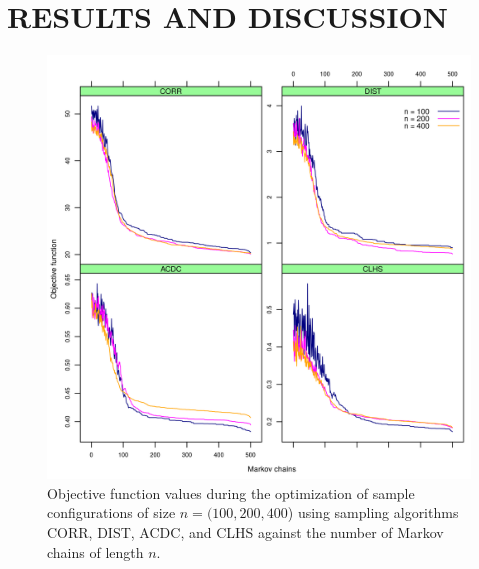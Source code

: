 \section{RESULTS AND DISCUSSION}

\begin{figure}[!ht]
 \centering
 \includegraphics[width=\textwidth]{fig/chap07-energy_corr_dist_acdc_clhs}
 \caption[Objective function values during the optimization of three sample configurations using four sampling 
 algorithms.]{Objective function values during the optimization of sample configurations of size 
 $n = (100, 200, 400$) using sampling algorithms CORR, DIST, ACDC, and CLHS against the number of Markov 
 chains of length $n$.}
 \label{fig:chap07-energy-all}
\end{figure}

